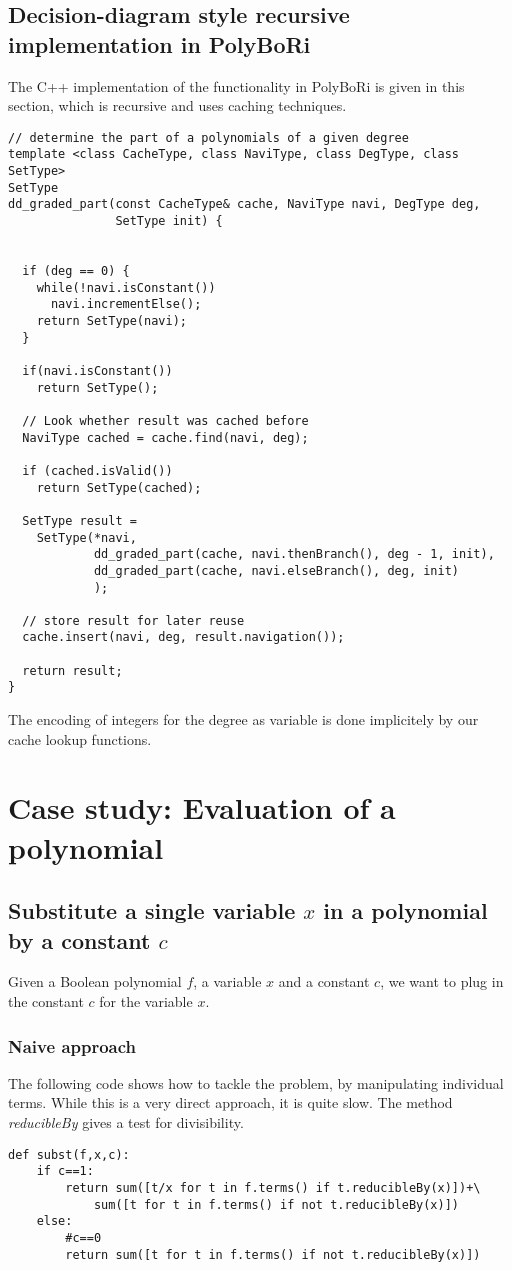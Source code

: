 \documentclass[]{article}
\newcommand{\PolyBoRi}{{\sc PolyBoRi}\xspace}
\newcommand{\functionname}[1]{\textit{#1}\xspace}
\begin{document}
\subsection{Decision-diagram style recursive implementation in \PolyBoRi}
The C++ implementation of the functionality in \PolyBoRi is given in this section, which is recursive and uses caching techniques.
\begin{lstlisting}
// determine the part of a polynomials of a given degree
template <class CacheType, class NaviType, class DegType, class SetType>
SetType
dd_graded_part(const CacheType& cache, NaviType navi, DegType deg,  
               SetType init) {


  if (deg == 0) {
    while(!navi.isConstant())
      navi.incrementElse();
    return SetType(navi);
  }

  if(navi.isConstant())
    return SetType();

  // Look whether result was cached before
  NaviType cached = cache.find(navi, deg);

  if (cached.isValid())
    return SetType(cached);

  SetType result = 
    SetType(*navi,  
            dd_graded_part(cache, navi.thenBranch(), deg - 1, init),
            dd_graded_part(cache, navi.elseBranch(), deg, init)
            );

  // store result for later reuse
  cache.insert(navi, deg, result.navigation());

  return result;
}
\end{lstlisting}
The encoding of integers for the degree as variable is done implicitely by our cache lookup functions.

\section{Case study: Evaluation of a polynomial}

\subsection{Substitute a single variable $x$ in a polynomial by a constant $c$}

Given a Boolean polynomial $f$, a variable $x$ and a constant $c$, we want to plug in the constant $c$ for the variable $x$.

\subsubsection{Naive approach}
The following code shows how to tackle the problem, by manipulating individual terms.
While this is a very direct approach, it is quite slow.
The method \functionname{reducibleBy} gives a test for divisibility.
\begin{lstlisting}
def subst(f,x,c):
    if c==1:
        return sum([t/x for t in f.terms() if t.reducibleBy(x)])+\
            sum([t for t in f.terms() if not t.reducibleBy(x)])
    else:
        #c==0
        return sum([t for t in f.terms() if not t.reducibleBy(x)])

\end{lstlisting}
\end{document}
